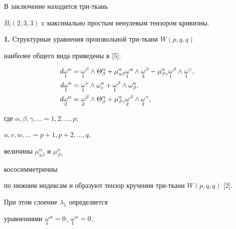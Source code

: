 В заключение находится три-ткань


$B_{l}(2,3,3)$ с максимально простым ненулевым тензором кривизны.


\medskip








{\bf 1.} Структурные уравнения произвольной три-ткани $W(p,q,q)$


наиболее общего вида приведены в [5]:


\begin{align}


d{\crazy{\omega}{1}}^{\alpha}&= {\crazy{\omega}{1}}^{\beta}\wedge


\Theta^{\alpha}_{\beta}+ \mu^{\alpha}_{u \beta}


{\crazy{\omega}{1}}^{u}\wedge{\crazy{\omega}{3}}^{\beta}-


\mu^{\alpha}_{\beta \gamma}{\crazy{\omega}{1}}^{\beta}\wedge


{\crazy{\omega}{1}}^{\gamma},\notag\\


%


d{\crazy{\omega}{1}}^{u}&= {\crazy{\omega}{1}}^{v}\wedge \omega^{u}_{v}+


{\crazy{\omega}{1}}^{\beta}\wedge \omega^{u}_{\beta},\\


%


d{\crazy{\omega}{2}}^{\alpha}&= {\crazy{\omega}{2}}^{\beta}\wedge


\Theta^{\alpha}_{\beta}+


\mu^{\alpha}_{\beta \gamma}{\crazy{\omega}{2}}^{\beta}\wedge


{\crazy{\omega}{2}}^{\gamma},\notag


\end{align}


где $\alpha, \beta, \gamma, \dotsc=1,2, \dotsc, p$;


$u,v,w, \dotsc= p+1, p+2,\dotsc, q$,


величины $\mu^{\alpha}_{u \beta}$ и $\mu^{\alpha}_{\beta \gamma}$ 


кососимметричны


по нижним индексам и образуют тензор кручения три-ткани $W(p,q,q)$ [2].


При этом слоение $\lambda_{1}$ определяется


уравнениями ${\displaystyle{\mathop{\omega}_{1}}}^{\alpha}=0$, ${\displaystyle{\mathop{\omega}_{1}}}^{u}=0$,


